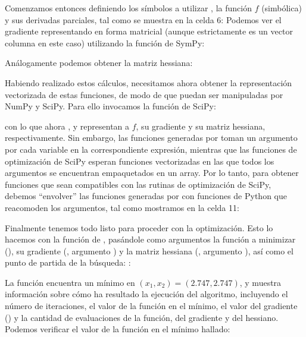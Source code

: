 Comenzamos entonces definiendo los símbolos a utilizar , la función $f$ (simbólica) y sus derivadas parciales, tal como se muestra en la celda 6:
Podemos ver el gradiente representando en forma matricial (aunque estrictamente es un vector columna en este caso) utilizando la función  de SymPy:

Análogamente podemos obtener la matriz hessiana:

Habiendo realizado estos cálculos, necesitamos ahora obtener la representación vectorizada de estas funciones, de modo de que puedan ser manipuladas por NumPy y SciPy. Para ello invocamos la función  de SciPy:


\noindent con lo que ahora ,  y  representan a $f$, su gradiente y su matriz hessiana, respectivamente. Sin embargo, las funciones generadas por  toman un argumento por cada variable en la correspondiente expresión, mientras que las funciones de optimización de SciPy esperan funciones vectorizadas en las que todos los argumentos se encuentran empaquetados en un array. Por lo tanto, para obtener funciones que sean compatibles con las rutinas de optimización de SciPy, debemos ``envolver'' las funciones generadas por  con funciones de Python que reacomoden los argumentos, tal como mostramos en la celda 11:

Finalmente tenemos todo listo para proceder con la optimización. Esto lo hacemos con la función  de , pasándole como argumentos la función a minimizar (), su gradiente (, argumento ) y la matriz hessiana (, argumento ), así como el punto de partida de la búsqueda: :


La función encuentra un mínimo en $(x_1, x_2) = (2.747, 2.747)$, y muestra información sobre cómo ha resultado la ejecución del algoritmo, incluyendo el número de iteraciones, el valor de la función en el mínimo, el valor del gradiente () y la cantidad de evaluaciones de la función, del gradiente y del hessiano. Podemos verificar el valor de la función en el mínimo hallado:

